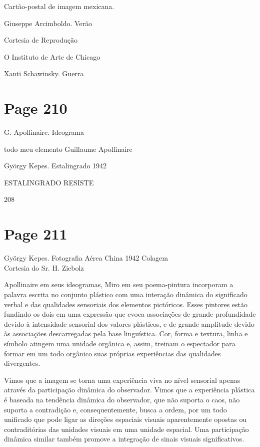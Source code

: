 \documentclass[a4paper]{article}
\begin{document}
Cartão-postal de imagem mexicana.

Giuseppe Arcimboldo. Verão

\small{Cortesia de Reprodução}

\small{O Instituto de Arte de Chicago}

Xanti Schawinsky. Guerra

\newpage
\section*{Page 210}

G. Apollinaire. Ideograma

todo meu elemento
Guillaume Apollinaire

György Kepes. Estalingrado 1942

ESTALINGRADO RESISTE

\vfill
\hspace*{\fill}208

\newpage
\section*{Page 211}

\vspace*{4in} %
\begin{flushright}
György Kepes. Fotografia Aérea China 1942 Colagem \\
Cortesia do Sr. H. Ziebolz
\end{flushright}

Apollinaire em seus ideogramas, Miro em seu poema-pintura incorporam a palavra escrita no conjunto plástico com uma interação dinâmica do significado verbal e das qualidades sensoriais dos elementos pictóricos. Esses pintores estão fundindo os dois em uma expressão que evoca associações de grande profundidade devido à intensidade sensorial dos valores plásticos, e de grande amplitude devido às associações descarregadas pela base linguística. Cor, forma e textura, linha e símbolo atingem uma unidade orgânica e, assim, treinam o espectador para formar em um todo orgânico suas próprias experiências das qualidades divergentes.

Vimos que a imagem se torna uma experiência viva no nível sensorial apenas através da participação dinâmica do observador. Vimos que a experiência plástica é baseada na tendência dinâmica do observador, que não suporta o caos, não suporta a contradição e, consequentemente, busca a ordem, por um todo unificado que pode ligar as direções espaciais visuais aparentemente opostas ou contraditórias das unidades visuais em uma unidade espacial. Uma participação dinâmica similar também promove a integração de sinais visuais significativos.
\end{document}
